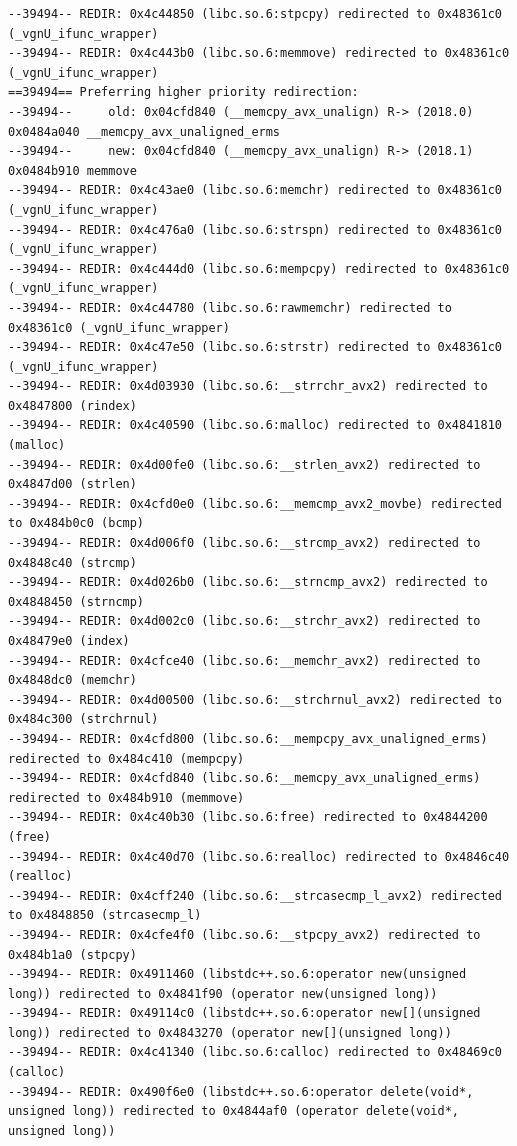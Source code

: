 \documentclass[a4paper,11pt]{article}
\begin{document}
\begin{lstlisting}
--39494-- REDIR: 0x4c44850 (libc.so.6:stpcpy) redirected to 0x48361c0 (_vgnU_ifunc_wrapper)
--39494-- REDIR: 0x4c443b0 (libc.so.6:memmove) redirected to 0x48361c0 (_vgnU_ifunc_wrapper)
==39494== Preferring higher priority redirection:
--39494--     old: 0x04cfd840 (__memcpy_avx_unalign) R-> (2018.0) 0x0484a040 __memcpy_avx_unaligned_erms
--39494--     new: 0x04cfd840 (__memcpy_avx_unalign) R-> (2018.1) 0x0484b910 memmove
--39494-- REDIR: 0x4c43ae0 (libc.so.6:memchr) redirected to 0x48361c0 (_vgnU_ifunc_wrapper)
--39494-- REDIR: 0x4c476a0 (libc.so.6:strspn) redirected to 0x48361c0 (_vgnU_ifunc_wrapper)
--39494-- REDIR: 0x4c444d0 (libc.so.6:mempcpy) redirected to 0x48361c0 (_vgnU_ifunc_wrapper)
--39494-- REDIR: 0x4c44780 (libc.so.6:rawmemchr) redirected to 0x48361c0 (_vgnU_ifunc_wrapper)
--39494-- REDIR: 0x4c47e50 (libc.so.6:strstr) redirected to 0x48361c0 (_vgnU_ifunc_wrapper)
--39494-- REDIR: 0x4d03930 (libc.so.6:__strrchr_avx2) redirected to 0x4847800 (rindex)
--39494-- REDIR: 0x4c40590 (libc.so.6:malloc) redirected to 0x4841810 (malloc)
--39494-- REDIR: 0x4d00fe0 (libc.so.6:__strlen_avx2) redirected to 0x4847d00 (strlen)
--39494-- REDIR: 0x4cfd0e0 (libc.so.6:__memcmp_avx2_movbe) redirected to 0x484b0c0 (bcmp)
--39494-- REDIR: 0x4d006f0 (libc.so.6:__strcmp_avx2) redirected to 0x4848c40 (strcmp)
--39494-- REDIR: 0x4d026b0 (libc.so.6:__strncmp_avx2) redirected to 0x4848450 (strncmp)
--39494-- REDIR: 0x4d002c0 (libc.so.6:__strchr_avx2) redirected to 0x48479e0 (index)
--39494-- REDIR: 0x4cfce40 (libc.so.6:__memchr_avx2) redirected to 0x4848dc0 (memchr)
--39494-- REDIR: 0x4d00500 (libc.so.6:__strchrnul_avx2) redirected to 0x484c300 (strchrnul)
--39494-- REDIR: 0x4cfd800 (libc.so.6:__mempcpy_avx_unaligned_erms) redirected to 0x484c410 (mempcpy)
--39494-- REDIR: 0x4cfd840 (libc.so.6:__memcpy_avx_unaligned_erms) redirected to 0x484b910 (memmove)
--39494-- REDIR: 0x4c40b30 (libc.so.6:free) redirected to 0x4844200 (free)
--39494-- REDIR: 0x4c40d70 (libc.so.6:realloc) redirected to 0x4846c40 (realloc)
--39494-- REDIR: 0x4cff240 (libc.so.6:__strcasecmp_l_avx2) redirected to 0x4848850 (strcasecmp_l)
--39494-- REDIR: 0x4cfe4f0 (libc.so.6:__stpcpy_avx2) redirected to 0x484b1a0 (stpcpy)
--39494-- REDIR: 0x4911460 (libstdc++.so.6:operator new(unsigned long)) redirected to 0x4841f90 (operator new(unsigned long))
--39494-- REDIR: 0x49114c0 (libstdc++.so.6:operator new[](unsigned long)) redirected to 0x4843270 (operator new[](unsigned long))
--39494-- REDIR: 0x4c41340 (libc.so.6:calloc) redirected to 0x48469c0 (calloc)
--39494-- REDIR: 0x490f6e0 (libstdc++.so.6:operator delete(void*, unsigned long)) redirected to 0x4844af0 (operator delete(void*, unsigned long))

\end{lstlisting}
\end{document}
